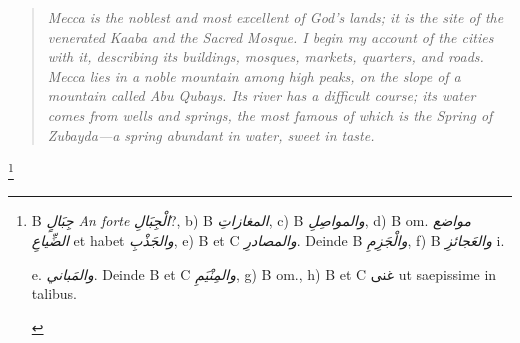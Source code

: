 \documentclass[11pt,a4paper]{article}
\newcommand{\variants}[1]{\footnote{\small\textcolor{footnotecolor}{#1}}}
\begin{document}
{\small\arabicfont

}



\bigskip



\begin{quote}

\small

\textit{Mecca is the noblest and most excellent of God's lands; it is the site of the venerated Kaaba and the Sacred Mosque. I begin my account of the cities with it, describing its buildings, mosques, markets, quarters, and roads. Mecca lies in a noble mountain among high peaks, on the slope of a mountain called Abu Qubays. Its river has a difficult course; its water comes from wells and springs, the most famous of which is the Spring of Zubayda---a spring abundant in water, sweet in taste.}

\end{quote}



\vspace{0.3cm}



\variants{B \textit{جِبَالٍ} \textit{An forte} \textit{الْجِبَالِ}?, b) B \textit{المغازاتِ}, c) B \textit{والمواصِلِ}, d) B om. \textit{مواضع الضِّياعِ} et habet \textit{والجَذْبِ}, e) B et C \textit{والمصادرِ}. Deinde B \textit{والْجَزِمِ}, f) B \textit{والعَجائزِ} i.



e. \textit{والمَباني}. Deinde B et C \textit{والمِنْيَمِ}, g) B om., h) B et C غنى ut saepissime in talibus.}



\clearpage
\end{document}
